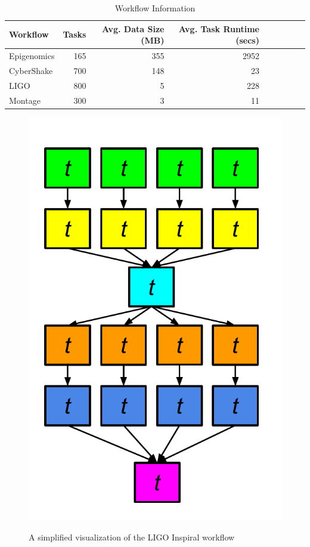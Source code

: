 \begin{table}[!htb]
\caption{Workflow Information }
\label{tab:evaluation_workflows}
\centering
\begin{tabular}{lrrrrrrrr}
\hline
Workflow & Tasks & Avg. Data Size (MB) &  Avg. Task Runtime (secs)  \\

\hline

Epigenomics &165 & 355&2952\\
CyberShake &700&148 & 23\\
LIGO &800& 5&228\\
Montage &300&3 &11\\


\hline
\end{tabular}
\end{table} 


\begin{figure}[!htb]
	\centering
	\includegraphics[width=0.4\linewidth]{figures/evaluation/inspiral.pdf} \\
	\caption{A simplified visualization of the LIGO Inspiral workflow}
	\label{fig:evaluation_shape_ligo}
\end{figure}

